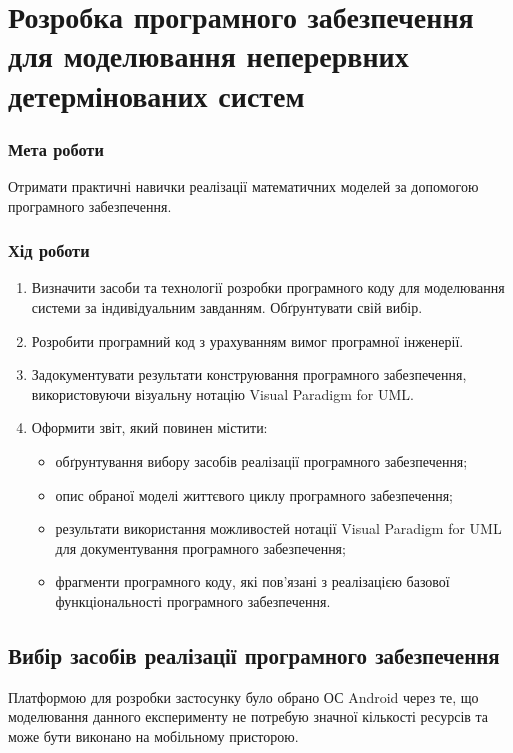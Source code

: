 



\newcommand{\labnumber}{4} %



\lstset{language=Kotlin}
\graphicspath{{figures/}}


\Ukrainian


\addtocounter{page}{1}

\section*{Розробка програмного забезпечення для моделювання неперервних детермінованих систем}
\subsubsection*{Мета роботи}
Отримати практичні навички реалізації математичних
моделей за допомогою програмного забезпечення.
\subsubsection*{Хід роботи}
\begin{enumerate}
\item Визначити засоби та технології розробки програмного коду для моделювання системи за індивідуальним завданням.
Обґрунтувати свій вибір.
\item Розробити програмний код з урахуванням вимог програмної інженерії.
\item Задокументувати результати конструювання програмного забезпечення, використовуючи візуальну нотацію Visual Paradigm for UML.
\item Оформити звіт, який повинен містити:
\begin{itemize}
\item обґрунтування вибору засобів реалізації програмного забезпечення;
\item опис обраної моделі життєвого циклу програмного забезпечення;
\item результати використання можливостей нотації Visual Paradigm for UML для документування програмного забезпечення;
\item фрагменти програмного коду, які пов'язані з реалізацією базової функціональності програмного забезпечення.
\end{itemize}
\end{enumerate}

\subsection{Вибір засобів реалізації програмного забезпечення}
Платформою для розробки застосунку було обрано ОС Android через те, що моделювання данного експерименту не потребую значної кількості ресурсів та може бути виконано на мобільному присторою.

